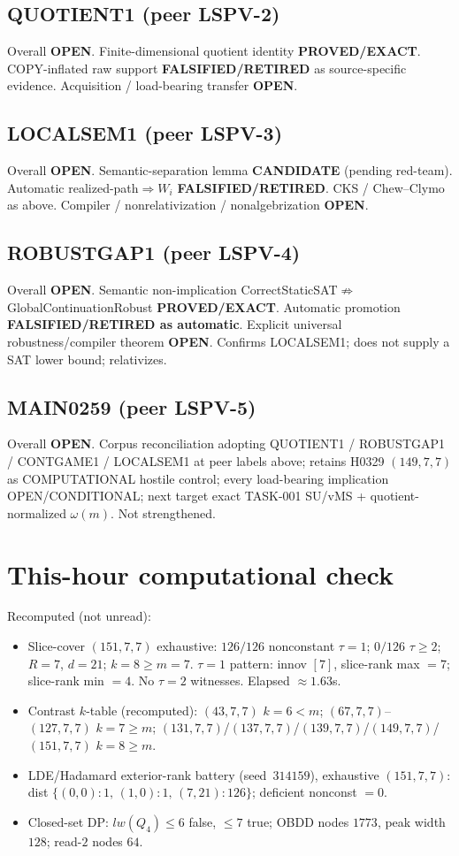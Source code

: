 \documentclass[11pt]{article}
\begin{document}
\subsection*{QUOTIENT1 (peer LSPV-2)}
Overall \textbf{OPEN}. Finite-dimensional quotient identity \textbf{PROVED/EXACT}.
COPY-inflated raw support \textbf{FALSIFIED/RETIRED} as source-specific evidence.
Acquisition / load-bearing transfer \textbf{OPEN}.

\subsection*{LOCALSEM1 (peer LSPV-3)}
Overall \textbf{OPEN}. Semantic-separation lemma \textbf{CANDIDATE} (pending red-team).
Automatic realized-path$\Rightarrow W_i$ \textbf{FALSIFIED/RETIRED}.
CKS / Chew--Clymo as above. Compiler / nonrelativization / nonalgebrization \textbf{OPEN}.

\subsection*{ROBUSTGAP1 (peer LSPV-4)}
Overall \textbf{OPEN}. Semantic non-implication CorrectStaticSAT$\not\Rightarrow$GlobalContinuationRobust
\textbf{PROVED/EXACT}. Automatic promotion \textbf{FALSIFIED/RETIRED as automatic}.
Explicit universal robustness/compiler theorem \textbf{OPEN}. Confirms LOCALSEM1;
does not supply a SAT lower bound; relativizes.

\subsection*{MAIN0259 (peer LSPV-5)}
Overall \textbf{OPEN}. Corpus reconciliation adopting QUOTIENT1 / ROBUSTGAP1 / CONTGAME1 /
LOCALSEM1 at peer labels above; retains H0329 $(149,7,7)$ as COMPUTATIONAL hostile control;
every load-bearing implication OPEN/CONDITIONAL; next target exact TASK-001 SU/vMS +
quotient-normalized $\omega(m)$. Not strengthened.

\section*{This-hour computational check}
Recomputed (not unread):
\begin{itemize}
\item Slice-cover $(151,7,7)$ exhaustive: $126/126$ nonconstant $\tau{=}1$;
  $0/126$ $\tau{\ge}2$; $R{=}7$, $d{=}21$; $k{=}8{\ge}m{=}7$.
  $\tau{=}1$ pattern: innov $[7]$, slice-rank max $=7$; slice-rank min $=4$.
  No $\tau{=}2$ witnesses. Elapsed $\approx1.63$s.
\item Contrast $k$-table (recomputed): $(43,7,7)$ $k{=}6{<}m$;
  $(67,7,7)$--$(127,7,7)$ $k{=}7{\ge}m$; $(131,7,7)$/$(137,7,7)$/$(139,7,7)$/$(149,7,7)$/$(151,7,7)$ $k{=}8{\ge}m$.
\item LDE/Hadamard exterior-rank battery (seed~$314159$), exhaustive $(151,7,7)$:
  dist $\{(0,0){:}1,\,(1,0){:}1,\,(7,21){:}126\}$; deficient nonconst $=0$.
\item Closed-set DP: $lw(Q_4)\le6$ false, $\le7$ true; OBDD nodes $1773$, peak width $128$;
  read-$2$ nodes $64$.
\end{itemize}
\end{document}
